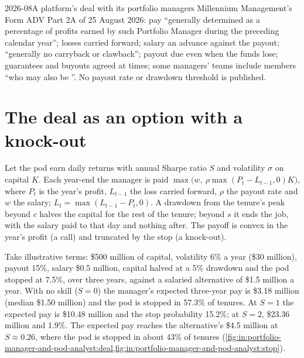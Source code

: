 \begin{dated}{2026-08}{A platform's deal with its portfolio managers}\label{dat:in:portfolio-manager-and-pod-analyst:deal}
Millennium Management's Form ADV Part 2A of 25 August 2026: pay ``generally determined as a percentage of profits earned
by such Portfolio Manager during the preceding calendar year''; losses carried forward; salary an advance against the
payout; ``generally no \textquotedbl carryback\textquotedbl{} or \textquotedbl clawback\textquotedbl''; payout due even
when the funds lose; guarantees and buyouts agreed at times; some managers' teams include members ``who may also be
\textquotedbl {}\textquotedbl''. No payout rate or drawdown threshold is published.
\end{dated}

\section{The deal as an option with a knock-out}

\begin{method}\label{met:in:portfolio-manager-and-pod-analyst:deal}
Let the pod earn daily returns with annual Sharpe ratio $S$ and volatility $\sigma$ on capital $K$. Each year-end the
manager is paid $\max\bigl(w,\ \rho\max(P_t-L_{t-1},0)K\bigr)$, where $P_t$ is the year's profit, $L_{t-1}$ the loss
carried forward, $\rho$ the payout rate and $w$ the salary; $L_t=\max(L_{t-1}-P_t,0)$. A drawdown from the tenure's
peak beyond $c$ halves the capital for the rest of the tenure; beyond $s$ it ends the job, with the salary paid to that
day and nothing after. The payoff is convex in the year's profit (a call) and truncated by the stop (a knock-out).
\end{method}

\begin{example}\label{ex:in:portfolio-manager-and-pod-analyst:deal}
Take illustrative terms: \$500 million of capital, volatility 6\% a year (\$30 million), payout 15\%, salary \$0.5
million, capital halved at a 5\% drawdown and the pod stopped at 7.5\%, over three years, against a salaried
alternative of \$1.5 million a year. With no skill ($S=0$) the manager's expected three-year pay is \$3.18 million
(median \$1.50 million) and the pod is stopped in 57.3\% of tenures. At $S=1$ the expected pay is \$10.48 million and the
stop probability 15.2\%; at $S=2$, \$23.36 million and 1.9\%. The expected pay reaches the alternative's \$4.5 million
at $S\approx0.26$, where the pod is stopped in about 43\% of tenures (\cref{fig:in:portfolio-manager-and-pod-analyst:deal,fig:in:portfolio-manager-and-pod-analyst:stop}).
\end{example}

